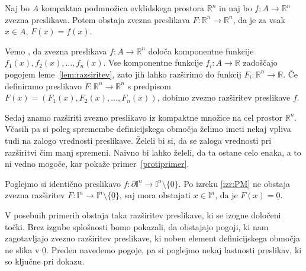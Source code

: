 \documentclass[mat1]{fmfdelo}
\newcommand{\R}{\mathbb R}
\newcommand{\I}{\mathbb I}
\newcommand{\0}{\underline{0}}
\begin{document}
\begin{posledica}
Naj bo $A$ kompaktna podmnožica evklidskega prostora $\R^n$ in naj bo \mbox{$f : A \to \R^n$} zvezna preslikava. Potem obstaja zvezna preslikava $F : \R^n \to \R^n$, da je za vsak $x \in A$, $F(x) = f(x)$.
\end{posledica}

\begin{dokaz}
Vemo , da zvezna preslikava $f : A \to \R^n$ določa komponentne funkcije $f_1(x), f_2(x), \dots , f_n(x)$. Vse komponentne funkcije $f_i : A \to \R$ zadoščajo pogojem leme~\ref{lem:razsiritev}, zato jih lahko razširimo do funkcij $F_i : \R^n \to \R$. Če definiramo preslikavo $F : \R^n \to \R^n$ s predpisom $F(x) = (F_1(x), F_2(x), \dots , F_n(x))$, dobimo zvezno razširitev preslikave $f$.
\end{dokaz}
Sedaj znamo razširiti zvezno preslikavo iz kompaktne množice na cel prostor $\R^n$. Včasih pa si poleg spremembe definicijskega območja želimo imeti nekaj vpliva tudi na zalogo vrednosti preslikave. Želeli bi si, da se zaloga vrednosti pri razširitvi čim manj spremeni. Naivno bi lahko želeli, da ta ostane celo enaka, a to ni vedno mogoče, kar pokaže primer~\ref{protiprimer}.

\begin{primer}\label{protiprimer}
Poglejmo si identično preslikavo $f : \partial \I^n \to \I^n \setminus \{ \0 \}$. Po izreku \ref{izr:PM} ne obstaja zvezna razširitev $F : \I^n \to \I^n \setminus \{ \0 \}$, saj mora obstajati $x \in \I^n$, da je $F(x) = \0$. 
\end{primer}

V posebnih primerih obstaja taka razširitev preslikave, ki se izogne določeni točki. Brez izgube splošnosti bomo pokazali, da obstajajo pogoji, ki nam zagotavljajo zvezno razširitev preslikave, ki noben element definicijskega območja ne slika v $\0$. Preden navedemo pogoje, pa si poglejmo nekaj lastnosti preslikav, ki so ključne pri dokazu.
\end{document}
